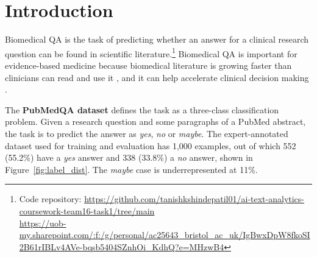 \documentclass[11pt]{article}
\begin{document}
\begin{abstract}
In Biomedical QA, the goal is to classify whether the published evidence supports a \textit{yes}, \textit{no} or \textit{maybe} answer to a clinical research question. Here we investigate the PubMedQA expert-annotated subset under the Jin et al.\ (2019) 500/500 split, performing 10-fold stratified cross-validation of classical models and a held-out validation fold (fold 0) for tuning transformer models.

With respect to textual representation (TF-IDF n-grams, BioBERT embeddings, Q, Q+Ctx, Q+Ctx+Ans combinations) and various classifiers (standard classifiers, zero-shot BART-MNLI, class-weighted, focal, ordinal, hierarchical, parameter-efficient LoRA), our best model---\textbf{PubMedBERT fine-tuned on Q+Ctx+Ans (A1g)}---achieves a test macro-F1 score of \textbf{0.604} (accuracy=75.4\%), considerably outperforming the TF-IDF+LR baseline (McNemar $b{=}164$, $c{=}40$, $p{<}0.001$).

For the per-class results, \textit{maybe} is still the bottleneck: A1g scored $F1_{\text{maybe}}{=}0.19$, and \textbf{PubMedBERT with focal loss (M2)} scored the best $F1_{\text{maybe}}{=}0.24$, but with a lower overall macro-F1 of 0.591. This suggests a trade-off between overall score and recovery of the minority label.
\end{abstract}

\section{Introduction}

Biomedical QA is the task of predicting whether an answer for a clinical research question can be found in scientific literature.\footnote{Code repository: \url{https://github.com/tanishkshindepatil01/ai-text-analytics-coursework-team16-task1/tree/main} \\ \url{https://uob-my.sharepoint.com/:f:/g/personal/ac25643_bristol_ac_uk/IgBwxDpW8fkoSI2B61rIBLv4AVe-bqsb5404SZnhOi_KdhQ?e=MHzwB4}} Biomedical QA is important for evidence-based medicine because biomedical literature is growing faster than clinicians can read and use it \cite{jin2022biomedicalqa_survey}, and it can help accelerate clinical decision making \cite{lee2020biobert}.

The \textbf{PubMedQA dataset} \cite{jin2019pubmedqa} defines the task as a three-class classification problem. Given a research question and some paragraphs of a PubMed abstract, the task is to predict the answer as \textit{yes}, \textit{no} or \textit{maybe}. The expert-annotated dataset used for training and evaluation has 1{,}000 examples, out of which 552 (55.2\%) have a \textit{yes} answer and 338 (33.8\%) a \textit{no} answer, shown in Figure~\ref{fig:label_dist}. The \textit{maybe} case is underrepresented at 11\%.
\end{document}

